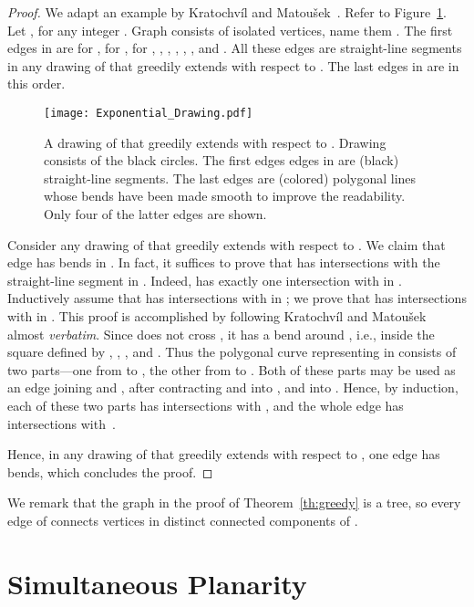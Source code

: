 \documentclass{llncs}
\begin{document}
\begin{proof}
We adapt an example by Kratochv\' il and Matou\v sek~\cite{km-sgrer-91}. Refer to Figure~\ref{fig:exponential}. Let , for any integer . Graph  consists of  isolated vertices, name them . The first  edges in  are  for ,  for ,  for , , , , , , and . All these edges are straight-line segments in any drawing  of  that greedily extends  with respect to . The last  edges in  are  in this order.

\begin{figure}[tb]
\centering
\texttt{[image: Exponential\_Drawing.pdf]}
\caption{A drawing  of  that greedily extends  with respect to . Drawing  consists of the black circles. The first edges  edges in  are (black) straight-line segments. The last  edges  are (colored) polygonal lines whose bends have been made smooth to improve the readability. Only four of the latter edges are shown.}
\label{fig:exponential}
\end{figure}

Consider any drawing  of  that greedily extends  with respect to . We claim that edge  has  bends in . In fact, it suffices to prove that  has  intersections with the straight-line segment  in . Indeed,  has exactly one intersection with  in . Inductively assume that  has  intersections with  in ; we prove that  has  intersections with  in . This proof is accomplished by following Kratochv\' il and Matou\v sek~\cite{km-sgrer-91} almost {\em verbatim}. Since  does not cross , it has a bend  around , i.e., inside the square defined by , , , and . Thus the polygonal curve representing  in  consists of two parts---one from  to , the other from  to . Both of these parts may be used as an edge joining  and , after contracting  and  into , and  into . Hence, by induction, each of these two parts has  intersections with , and the whole edge  has  intersections with~.

Hence, in any drawing  of  that greedily extends  with respect to , one edge has  bends, which concludes the proof.
\end{proof}

We remark that the graph  in the proof of Theorem~\ref{th:greedy} is a tree, so every edge of  connects vertices in distinct connected components of .



\section{Simultaneous Planarity}
\label{sec:S2}
\end{document}
